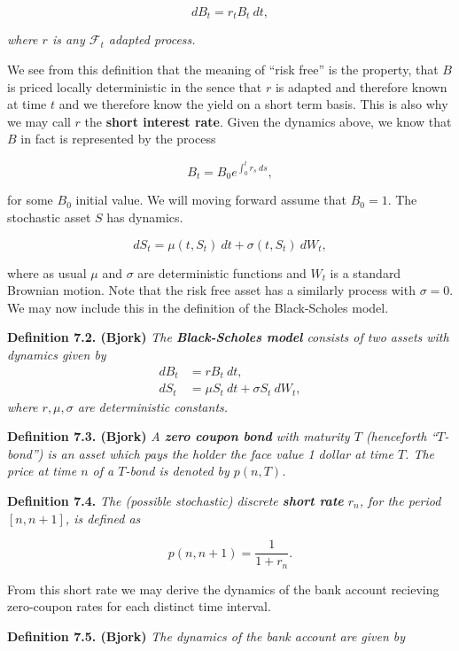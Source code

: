 \documentclass[a4paper,10pt,openany]{book}
\begin{document}
\[
dB_t=r_t B_t\ dt,\tag{7.1}
\]

\emph{where \(r\) is any \(\mathcal{F}_t\) adapted process.}

We see from this definition that the meaning of ``risk free'' is the property, that \(B\) is priced locally deterministic in the sence that \(r\) is adapted and therefore known at time \(t\) and we therefore know the yield on a short term basis. This is also why we may call \(r\) the \textbf{short interest rate}. Given the dynamics above, we know that \(B\) in fact is represented by the process

\[
B_t=B_0e^{\int_0^tr_s\ ds},
\]

for some \(B_0\) initial value. We will moving forward assume that \(B_0=1\). The stochastic asset \(S\) has dynamics.

\[
dS_t=\mu(t,S_t)\ dt + \sigma(t,S_t)\ dW_t,\tag{7.2}
\]

where as usual \(\mu\) and \(\sigma\) are deterministic functions and \(W_t\) is a standard Brownian motion. Note that the risk free asset has a similarly process with \(\sigma = 0\). We may now include this in the definition of the Black-Scholes model.

\textbf{Definition 7.2. (Bjork)} \emph{The \textbf{Black-Scholes model} consists of two assets with dynamics given by}
\begin{align*}
dB_t&=rB_t\ dt,\tag{7.3}\\
dS_t&=\mu S_t\ dt+\sigma S_t\ dW_t,\tag{7.4}
\end{align*}
\emph{where \(r,\mu,\sigma\) are deterministic constants.}

\textbf{Definition 7.3. (Bjork)} \emph{A \textbf{zero coupon bond} with maturity \(T\) (henceforth ``\(T\)-bond'') is an asset which pays the holder the face value 1 dollar at time \(T\). The price at time \(n\) of a \(T\)-bond is denoted by \(p(n,T)\).}

\textbf{Definition 7.4.} \emph{The (possible stochastic) discrete \textbf{short rate} \(r_n\), for the period \([n,n+1]\), is defined as}

\[
p(n,n+1)=\frac{1}{1+ r_n}.\tag{7.6}
\]

From this short rate we may derive the dynamics of the bank account recieving zero-coupon rates for each distinct time interval.

\textbf{Definition 7.5. (Bjork)} \emph{The dynamics of the bank account are given by}
\end{document}
